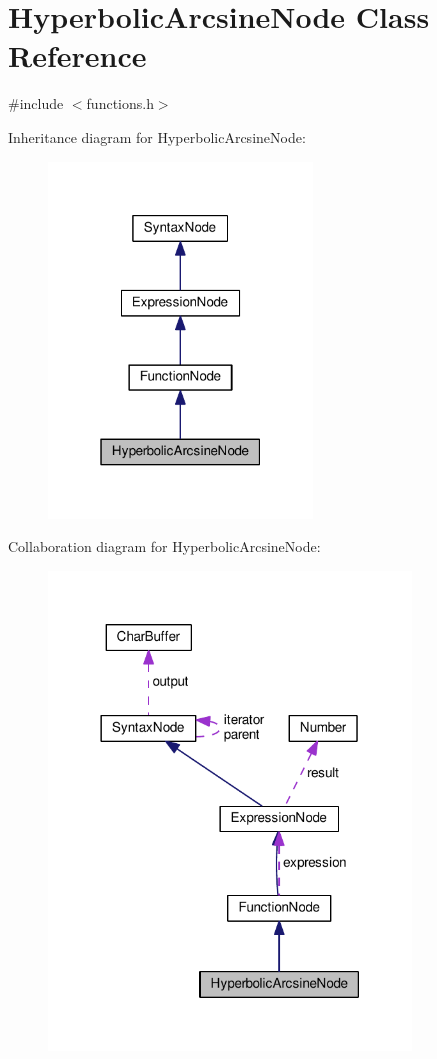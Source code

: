 \hypertarget{classHyperbolicArcsineNode}{}\section{Hyperbolic\+Arcsine\+Node Class Reference}
\label{classHyperbolicArcsineNode}


{\ttfamily \#include $<$functions.\+h$>$}



Inheritance diagram for Hyperbolic\+Arcsine\+Node\+:\nopagebreak
\begin{figure}[H]
\begin{center}
\leavevmode
\includegraphics[width=199pt]{classHyperbolicArcsineNode__inherit__graph}
\end{center}
\end{figure}


Collaboration diagram for Hyperbolic\+Arcsine\+Node\+:\nopagebreak
\begin{figure}[H]
\begin{center}
\leavevmode
\includegraphics[width=273pt]{classHyperbolicArcsineNode__coll__graph}
\end{center}
\end{figure}
